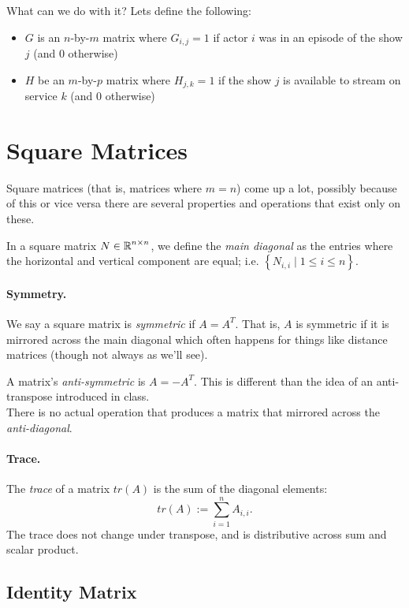 What can we do with it? Lets define the following:
\begin{itemize}
\item $G$ is an $n$-by-$m$ matrix where $G_{i,j}=1$ if actor $i$ was in an episode of the show $j$ (and $0$ otherwise)
\item $H$ be an $m$-by-$p$ matrix where $H_{j,k}=1$ if the show $j$ is available to stream on service $k$ (and $0$ otherwise) 
\end{itemize}


\section{Square Matrices}
Square matrices (that is, matrices where $m=n$) come up a lot, 
possibly because of this or vice versa there are several properties and operations that exist only on these. 

In a square matrix $N\in\operatorname{\mathbb{R}}^{n\times n}$, we define the \emph{main diagonal} as the entries where the horizontal and vertical component are equal; 
i.e. $\left\{N_{i,i} \mid 1 \le i \le n\right\}$. 

\paragraph{Symmetry.}
We say a square matrix is \emph{symmetric} if $A=A^T$.
That is, $A$ is symmetric if it is mirrored across the main diagonal which often happens for things like distance matrices (though not always as we'll see). 

\begin{aside}
A matrix's \textit{anti-symmetric} is $A = -A^T$. This is different than the idea of an anti-transpose introduced in class. \\

There is no actual operation that produces a matrix that mirrored across the \textit{anti-diagonal}.
\end{aside}

\paragraph{Trace. }
The \emph{trace} of a matrix $tr(A)$ is the sum of the diagonal elements: \[tr(A) := \sum_{i=1}^n A_{i,i}.\] 
The trace does not change under transpose, and is distributive across sum and scalar product. 

\subsection{Identity Matrix}

